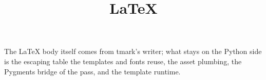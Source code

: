 \documentclass[a4paper,twoside]{article}
\title{\LaTeX{}}
\author{}\date{}
\begin{document}
\maketitle
The \LaTeX{} body itself comes from tmark's writer; what stays on the Python side
is the escaping table the templates and fonts reuse, the asset plumbing, the
Pygments bridge of the  pass, and the template runtime.
\end{document}
